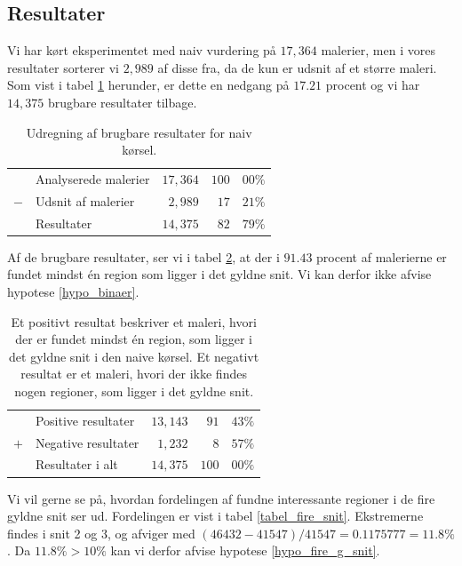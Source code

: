 {\subsection{Resultater}
Vi har kørt eksperimentet med naiv vurdering på $17,364$ malerier, men i
vores resultater sorterer vi $2,989$ af disse fra, da de kun er udsnit
af et større maleri.  Som vist i tabel \ref{tabel_fjern_detaljer}
herunder, er dette en nedgang på $17.21$ procent og vi har $14,375$
brugbare resultater tilbage.

\begin{table}[H]
    \centering
    \begin{tabular}{r@{\ \ }p{12em}r|r@{.}l}
            & Analyserede malerier & $17,364$ & $100$ & $00\%$   \\
        $-$ & Udsnit af malerier   &  $2,989$ &  $17$ & $21\%$   \\\hline
            & Resultater           & $14,375$ &  $82$ & $79\%$
    \end{tabular}
    \caption[]{Udregning af brugbare resultater for naiv kørsel.}
    \label{tabel_fjern_detaljer}
\end{table}

Af de brugbare resultater, ser vi i tabel \ref{tabel_fordeling}, at der
i $91.43$ procent af malerierne er fundet mindst én region som ligger i
det gyldne snit. Vi kan derfor ikke afvise hypotese \ref{hypo_binaer}.

\begin{table}[H]
    \centering
    \begin{tabular}{r@{\ \ }p{12em}r|r@{.}l}
            & Positive resultater   & $13,143$ &  $91$ & $43\%$ \\
        $+$ & Negative resultater   &  $1,232$ &   $8$ & $57\%$ \\\hline
            & Resultater i alt      & $14,375$ & $100$ & $00\%$
    \end{tabular}
    \caption[]{Et positivt resultat beskriver et maleri, hvori der er
    fundet mindst én region, som ligger i det gyldne snit i den naive
    kørsel. Et negativt resultat er et maleri, hvori der ikke findes
    nogen regioner, som ligger i det gyldne snit.}
    \label{tabel_fordeling}
\end{table}

Vi vil gerne se på, hvordan fordelingen af fundne interessante regioner
i de fire gyldne snit ser ud. Fordelingen er vist i tabel
\ref{tabel_fire_snit}. Ekstremerne findes i snit 2 og 3, og afviger med
$(46432-41547)/41547 = 0.1175777 = 11.8 \%$. Da $11.8 \% > 10 \%$
kan vi derfor afvise hypotese \ref{hypo_fire_g_snit}.

}
